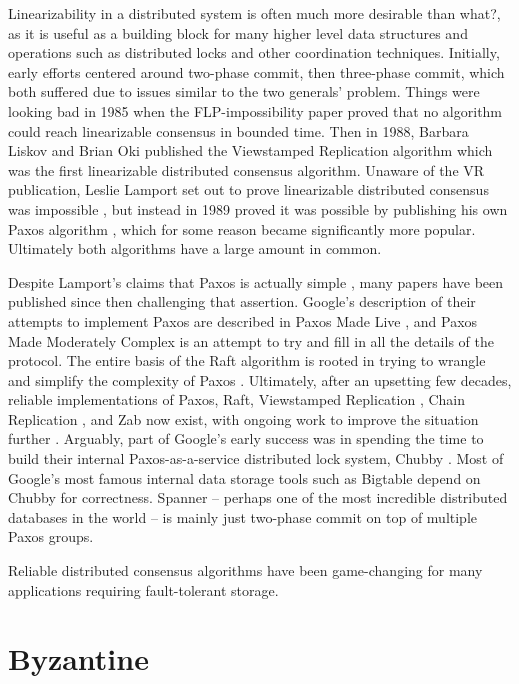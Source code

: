 \documentclass[11pt,fleqn,openany]{book}
\newcommand{\bs}[1]{{\color{red}#1}}
\begin{document}
Linearizability in a distributed system is often much more desirable
\bs{than what?}, as it is
useful as a building block for many higher level data structures and operations
such as distributed locks and other coordination techniques. Initially, early
efforts centered around two-phase commit, then three-phase commit, which both
suffered due to issues similar to the two generals' problem. Things were looking
bad in 1985 when the FLP-impossibility paper \cite{flp} proved that no algorithm
could reach linearizable consensus in bounded time. Then in 1988, Barbara Liskov
and Brian Oki published the Viewstamped Replication algorithm \cite{vr} which
was the first linearizable distributed consensus algorithm. Unaware of the VR
publication, Leslie Lamport set out to prove linearizable distributed consensus
was impossible \cite{paxos-note}, but instead in 1989 proved it was possible by
publishing his own Paxos algorithm \cite{paxos}, which for some reason became
significantly more popular. Ultimately both algorithms have a large amount in
common.

Despite Lamport's claims that Paxos is actually simple \cite{paxos-simple},
many papers have been published since then
challenging that assertion. Google's description of their attempts to implement
Paxos are described in Paxos Made Live \cite{paxos-live},
and Paxos Made Moderately
Complex \cite{paxos-complex} is an attempt to try and fill in all the details of
the protocol. The entire basis of the Raft algorithm is rooted in trying to
wrangle and simplify the complexity of Paxos \cite{raft}. Ultimately, after an
upsetting few decades, reliable implementations of Paxos, Raft, Viewstamped
Replication \cite{vrr}, Chain Replication \cite{chain-rep}, and Zab \cite{zab}
now exist, with ongoing work to improve the situation
further \cite{epaxos,paxos-flexible}. Arguably, part of Google's early success
was in spending the time to build their internal Paxos-as-a-service distributed
lock system, Chubby \cite{chubby}. Most of Google's most famous internal data
storage tools such as Bigtable \cite{bigtable} depend on Chubby for
correctness. Spanner \cite{spanner} -- perhaps one of the most incredible
distributed databases in the world -- is mainly just two-phase commit on top of
multiple Paxos groups.

Reliable distributed consensus algorithms have been game-changing for many
applications requiring fault-tolerant storage.

\section{Byzantine}
\end{document}
